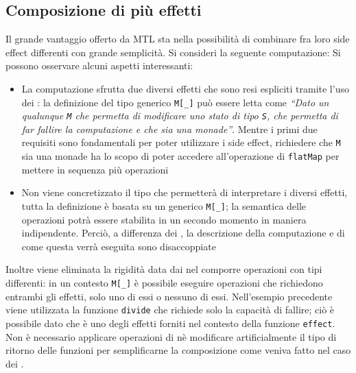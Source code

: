\subsection{Composizione di più effetti}
\label{sub:composizione-di-piu-effetti}
Il grande vantaggio offerto da MTL sta nella possibilità di combinare fra loro side effect differenti con grande semplicità. Si consideri la seguente computazione:
Si possono osservare alcuni aspetti interessanti:
\begin{itemize}
  \item La computazione sfrutta due diversi effetti che sono resi espliciti tramite l'uso dei : la definizione del tipo generico \lstinline{M[_]} può essere letta come \emph{``Dato un qualunque \lstinline{M} che permetta di modificare uno stato di tipo \lstinline{S}, che permetta di far fallire la computazione e che sia una monade''}. Mentre i primi due requisiti sono fondamentali per poter utilizzare i side effect, richiedere che \lstinline{M} sia una monade ha lo scopo di poter accedere all'operazione di \lstinline{flatMap} per mettere in sequenza più operazioni
  \item Non viene concretizzato il tipo che permetterà di interpretare i diversi effetti, tutta la definizione è basata su un generico \lstinline{M[_]}; la semantica delle operazioni potrà essere stabilita in un secondo momento in maniera indipendente. Perciò, a differenza dei , la descrizione della computazione e di come questa verrà eseguita sono disaccoppiate
\end{itemize}

Inoltre viene eliminata la rigidità data dai  nel comporre operazioni con tipi differenti: in un contesto \lstinline{M[_]} è possibile eseguire operazioni che richiedono entrambi gli effetti, solo uno di essi o nessuno di essi. Nell'esempio precedente viene utilizzata la funzione \lstinline{divide} che richiede solo la capacità di fallire; ciò è possibile dato che è uno degli effetti forniti nel contesto della funzione \lstinline{effect}. Non è necessario applicare operazioni di  nè modificare artificialmente il tipo di ritorno delle funzioni per semplificarne la composizione come veniva fatto nel caso dei .

